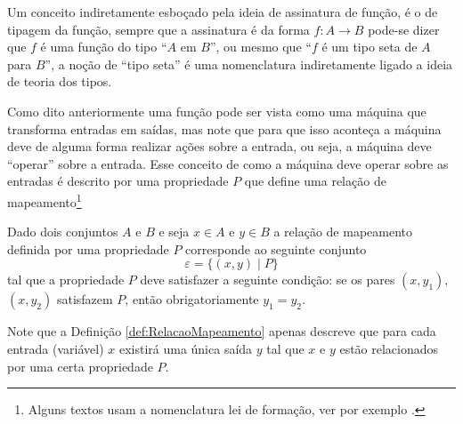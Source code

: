 
Um conceito indiretamente esboçado pela ideia de assinatura de função, é o de tipagem da função, sempre que a assinatura é da forma $f: A \rightarrow B$ pode-se dizer que $f$ é uma função do tipo ``$A$ em $B$'', ou mesmo que ``$f$ é um tipo seta de $A$ para $B$'', a noção de ``tipo seta'' é uma nomenclatura indiretamente ligado a ideia de teoria dos tipos.


Como dito anteriormente uma função pode ser vista como uma máquina que transforma entradas em saídas, mas note que para que isso aconteça a máquina deve de alguma forma realizar ações sobre a entrada, ou seja, a máquina deve ``operar'' sobre a entrada. Esse conceito de como a máquina deve operar sobre as entradas é descrito por uma propriedade $P$ que define uma relação de mapeamento\footnote{Alguns textos usam a nomenclatura lei de formação, ver por exemplo \cite{carmo2013}.}

\begin{definicao}\label{def:RelacaoMapeamento}
	Dado dois conjuntos $A$ e $B$ e seja $x \in A$ e $y \in B$ a relação de mapeamento definida por uma propriedade $P$ corresponde  ao seguinte conjunto 
	$$\varepsilon = \{(x, y)\mid P\}$$ 
  tal que a propriedade $P$ deve satisfazer a seguinte condição: se os pares $(x, y_1),$ $(x, y_2)$ satisfazem $P$, então obrigatoriamente $y_1 = y_2$.
\end{definicao}

Note que a Definição \ref{def:RelacaoMapeamento} apenas descreve que para cada entrada (variável) $x$ existirá uma única saída $y$ tal que $x$ e  $y$ estão relacionados por uma certa propriedade $P$.

